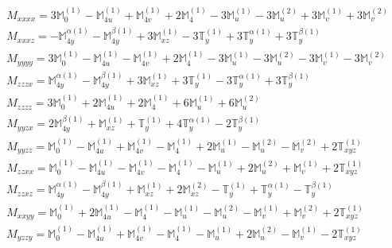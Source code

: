 \documentclass[fleqn,8pt,landscape]{jsarticle}
\begin{document}
\begin{align*}
& M_{xxxx} = 3 \mathbb{M}_{0}^{(1)} - \mathbb{M}_{4u}^{(1)} + \mathbb{M}_{4v}^{(1)} + 2 \mathbb{M}_{4}^{(1)} - 3 \mathbb{M}_{u}^{(1)} - 3 \mathbb{M}_{u}^{(2)} + 3 \mathbb{M}_{v}^{(1)} + 3 \mathbb{M}_{v}^{(2)} \\
& M_{xxxz} = - \mathbb{M}_{4y}^{\alpha(1)} - \mathbb{M}_{4y}^{\beta(1)} + 3 \mathbb{M}_{xz}^{(1)} - 3 \mathbb{T}_{y}^{(1)} + 3 \mathbb{T}_{y}^{\alpha(1)} + 3 \mathbb{T}_{y}^{\beta(1)} \\
& M_{yyyy} = 3 \mathbb{M}_{0}^{(1)} - \mathbb{M}_{4u}^{(1)} - \mathbb{M}_{4v}^{(1)} + 2 \mathbb{M}_{4}^{(1)} - 3 \mathbb{M}_{u}^{(1)} - 3 \mathbb{M}_{u}^{(2)} - 3 \mathbb{M}_{v}^{(1)} - 3 \mathbb{M}_{v}^{(2)} \\
& M_{zzzx} = \mathbb{M}_{4y}^{\alpha(1)} - \mathbb{M}_{4y}^{\beta(1)} + 3 \mathbb{M}_{xz}^{(1)} + 3 \mathbb{T}_{y}^{(1)} - 3 \mathbb{T}_{y}^{\alpha(1)} + 3 \mathbb{T}_{y}^{\beta(1)} \\
& M_{zzzz} = 3 \mathbb{M}_{0}^{(1)} + 2 \mathbb{M}_{4u}^{(1)} + 2 \mathbb{M}_{4}^{(1)} + 6 \mathbb{M}_{u}^{(1)} + 6 \mathbb{M}_{u}^{(2)} \\
& M_{yyzx} = 2 \mathbb{M}_{4y}^{\beta(1)} + \mathbb{M}_{xz}^{(1)} + \mathbb{T}_{y}^{(1)} + 4 \mathbb{T}_{y}^{\alpha(1)} - 2 \mathbb{T}_{y}^{\beta(1)} \\
& M_{yyzz} = \mathbb{M}_{0}^{(1)} - \mathbb{M}_{4u}^{(1)} + \mathbb{M}_{4v}^{(1)} - \mathbb{M}_{4}^{(1)} + 2 \mathbb{M}_{u}^{(1)} - \mathbb{M}_{u}^{(2)} - \mathbb{M}_{v}^{(2)} + 2 \mathbb{T}_{xyz}^{(1)} \\
& M_{zzxx} = \mathbb{M}_{0}^{(1)} - \mathbb{M}_{4u}^{(1)} - \mathbb{M}_{4v}^{(1)} - \mathbb{M}_{4}^{(1)} - \mathbb{M}_{u}^{(1)} + 2 \mathbb{M}_{u}^{(2)} + \mathbb{M}_{v}^{(1)} + 2 \mathbb{T}_{xyz}^{(1)} \\
& M_{zzxz} = \mathbb{M}_{4y}^{\alpha(1)} - \mathbb{M}_{4y}^{\beta(1)} + \mathbb{M}_{xz}^{(1)} + 2 \mathbb{M}_{xz}^{(2)} - \mathbb{T}_{y}^{(1)} + \mathbb{T}_{y}^{\alpha(1)} - \mathbb{T}_{y}^{\beta(1)} \\
& M_{xxyy} = \mathbb{M}_{0}^{(1)} + 2 \mathbb{M}_{4u}^{(1)} - \mathbb{M}_{4}^{(1)} - \mathbb{M}_{u}^{(1)} - \mathbb{M}_{u}^{(2)} - \mathbb{M}_{v}^{(1)} + \mathbb{M}_{v}^{(2)} + 2 \mathbb{T}_{xyz}^{(1)} \\
& M_{yzzy} = \mathbb{M}_{0}^{(1)} - \mathbb{M}_{4u}^{(1)} + \mathbb{M}_{4v}^{(1)} - \mathbb{M}_{4}^{(1)} - \mathbb{M}_{u}^{(1)} + 2 \mathbb{M}_{u}^{(2)} - \mathbb{M}_{v}^{(1)} - 2 \mathbb{T}_{xyz}^{(1)} \\

\end{align*}
\end{document}
